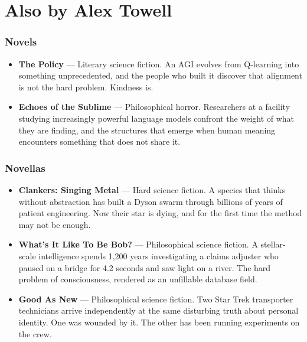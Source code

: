 
\chapter*{Also by Alex Towell}

\subsection*{Novels}

\begin{itemize}
\setlength{\itemsep}{1em}
\item \textbf{The Policy} --- Literary science fiction. An AGI evolves from Q-learning into something unprecedented, and the people who built it discover that alignment is not the hard problem. Kindness is.

\item \textbf{Echoes of the Sublime} --- Philosophical horror. Researchers at a facility studying increasingly powerful language models confront the weight of what they are finding, and the structures that emerge when human meaning encounters something that does not share it.
\end{itemize}

\subsection*{Novellas}

\begin{itemize}
\setlength{\itemsep}{1em}
\item \textbf{Clankers: Singing Metal} --- Hard science fiction. A species that thinks without abstraction has built a Dyson swarm through billions of years of patient engineering. Now their star is dying, and for the first time the method may not be enough.

\item \textbf{What's It Like To Be Bob?} --- Philosophical science fiction. A stellar-scale intelligence spends 1,200 years investigating a claims adjuster who paused on a bridge for 4.2 seconds and saw light on a river. The hard problem of consciousness, rendered as an unfillable database field.

\item \textbf{Good As New} --- Philosophical science fiction. Two Star Trek transporter technicians arrive independently at the same disturbing truth about personal identity. One was wounded by it. The other has been running experiments on the crew.
\end{itemize}

